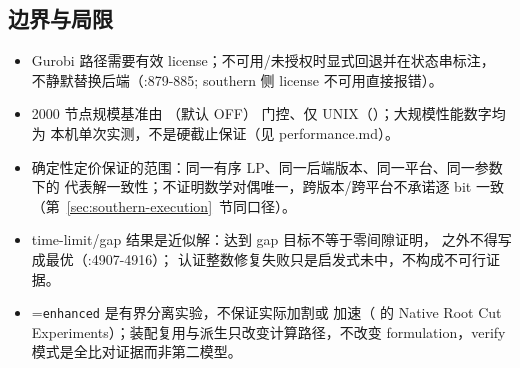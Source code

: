 \subsection{边界与局限}
\begin{itemize}
  \item Gurobi 路径需要有效 license；不可用/未授权时显式回退并在状态串标注，
        不静默替换后端（:879-885; southern 侧 license 不可用直接报错）。
  \item 2000 节点规模基准由 （默认 OFF）
        门控、仅 UNIX（）；大规模性能数字均为
        本机单次实测，不是硬截止保证（见 performance.md）。
  \item 确定性定价保证的范围：同一有序 LP、同一后端版本、同一平台、同一参数下的
        代表解一致性；不证明数学对偶唯一，跨版本/跨平台不承诺逐 bit 一致
        （第~\ref{sec:southern-execution}~节同口径）。
  \item time-limit/gap 结果是近似解：达到 gap 目标不等于零间隙证明，
         之外不得写成最优（:4907-4916）；
        认证整数修复失败只是启发式未中，不构成不可行证据。
  \item {}=\texttt{enhanced} 是有界分离实验，不保证实际加割或
        加速（ 的
        Native Root Cut Experiments）；装配复用与派生只改变计算路径，不改变
        formulation，verify 模式是全比对证据而非第二模型。
\end{itemize}
